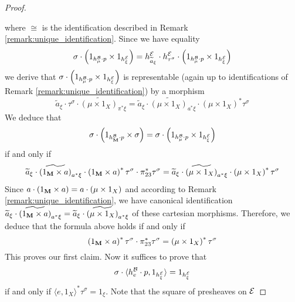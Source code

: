 \begin{proof}
\begin{center}
\end{center}
where $\cong$ is the identification described in Remark \ref{remark:unique_identification}. Since we have equality
$$\sigma \cdot \left(1_{h^{{\mathcal B}}_{\mu}\cdot p} \times 1_{h^{{\mathcal E}}_{\xi}} \right) = h^{{\mathcal E}}_{\widetilde{a}_{\xi}}\cdot h^{{\mathcal E}}_{\tau^{\sigma}}\cdot \left(1_{h^{{\mathcal B}}_{\mu}\cdot p} \times 1_{h^{{\mathcal E}}_{\xi}} \right)$$
we derive that $\sigma \cdot \left(1_{h^{{\mathcal B}}_{\mu}\cdot p} \times 1_{h^{{\mathcal E}}_{\xi}} \right)$ is representable (again up to identifications of Remark \ref{remark:unique_identification}) by a morphism
$$\widetilde{a}_{\xi}\cdot \tau^{\sigma}\cdot \widetilde{\left(\mu\times 1_X\right)}_{\pi^*\xi} = \widetilde{a}_{\xi}\cdot \widetilde{\left(\mu\times 1_X\right)}_{a^*\xi}\cdot \left(\mu\times 1_X\right)^*\tau^{\sigma}$$
We deduce that
$$\sigma \cdot \left(1_{h^{{\mathcal B}}_{\mathbf{M}}\cdot p} \times \sigma \right) = \sigma \cdot \left(1_{h^{{\mathcal B}}_{\mu}\cdot p} \times 1_{h^{{\mathcal E}}_{\xi}} \right)$$
if and only if
$$\widetilde{a}_{\xi} \cdot \widetilde{\left(1_{\mathbf{M}}\times a\right)}_{a^*\xi}\cdot \left(1_{\mathbf{M}}\times a\right)^*\tau^{\sigma}\cdot \pi^*_{23}\tau^\sigma =  \widetilde{a}_{\xi}\cdot \widetilde{\left(\mu\times 1_X\right)}_{a^*\xi}\cdot \left(\mu\times 1_X\right)^*\tau^{\sigma}$$
Since $a\cdot (1_{\mathbf{M}}\times a) = a\cdot (\mu \times 1_X)$ and according to Remark \ref{remark:unique_identification}, we have canonical identification $\widetilde{a}_{\xi} \cdot \widetilde{\left(1_{\mathbf{M}}\times a\right)}_{a^*\xi} = \widetilde{a}_{\xi}\cdot \widetilde{\left(\mu\times 1_X\right)}_{a^*\xi}$ of these cartesian morphisms. Therefore, we deduce that the formula above holds if and only if
$$\left(1_{\mathbf{M}}\times a\right)^*\tau^{\sigma}\cdot \pi^*_{23}\tau^\sigma = \left(\mu\times 1_X\right)^*\tau^{\sigma}$$
This proves our first claim. Now it suffices to prove that
$$\sigma \cdot \langle h^{{\mathcal B}}_{e}\cdot p, 1_{h^{{\mathcal E}}_{\xi}} \rangle = 1_{h^{{\mathcal E}}_{\xi}}$$
if and only if $\langle e, 1_X\rangle^*\tau^{\sigma} = 1_{\xi}$. Note that the square of presheaves on ${\mathcal E}$

\end{proof}
